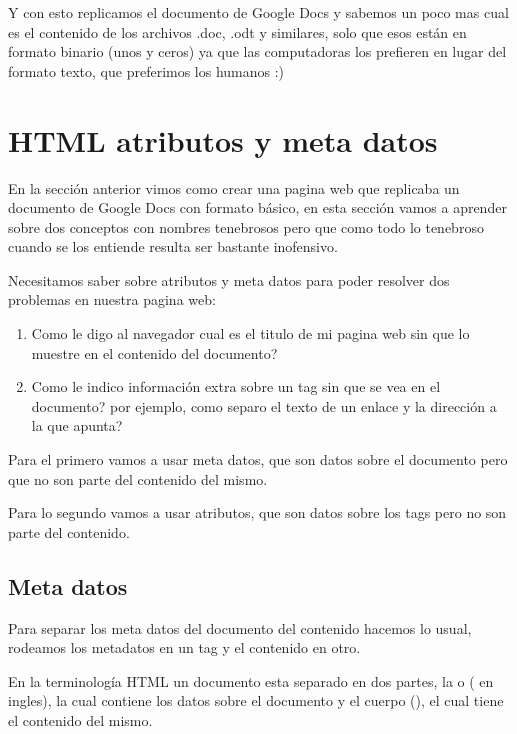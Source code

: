 \documentclass[letterpaper,10pt,spanish]{sphinxmanual}
\begin{document}
Y con esto replicamos el documento de Google Docs y sabemos un poco mas cual es
el contenido de los archivos .doc, .odt y similares, solo que esos están en
formato binario (unos y ceros) ya que las computadoras los prefieren en lugar
del formato texto, que preferimos los humanos :)


\chapter{HTML atributos y meta datos}
\label{\detokenize{html-atributos-y-metadatos::doc}}\label{\detokenize{html-atributos-y-metadatos:html-atributos-y-meta-datos}}
En la sección anterior vimos como crear una pagina web que replicaba un
documento de Google Docs con formato básico, en esta sección vamos a aprender
sobre dos conceptos con nombres tenebrosos pero que como todo lo tenebroso
cuando se los entiende resulta ser bastante inofensivo.

Necesitamos saber sobre atributos y meta datos para poder resolver dos problemas
en nuestra pagina web:
\begin{enumerate}
\item {} 
Como le digo al navegador cual es el titulo de mi pagina web sin que lo muestre en el contenido del documento?

\item {} 
Como le indico información extra sobre un tag sin que se vea en el documento? por ejemplo, como separo el texto de un enlace y la dirección a la que apunta?

\end{enumerate}

Para el primero vamos a usar meta datos, que son datos sobre el documento pero
que no son parte del contenido del mismo.

Para lo segundo vamos a usar atributos, que son datos sobre los tags pero no
son parte del contenido.


\section{Meta datos}
\label{\detokenize{html-atributos-y-metadatos:meta-datos}}
Para separar los meta datos del documento del contenido hacemos lo usual,
rodeamos los metadatos en un tag y el contenido en otro.

En la terminología HTML un documento esta separado en dos partes, la  o
 ( en ingles), la cual contiene los datos sobre el documento
y el cuerpo (), el cual tiene el contenido del mismo.
\end{document}
